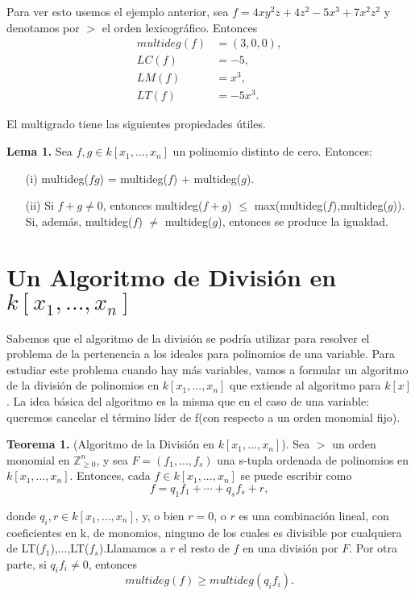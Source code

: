 Para ver esto usemos el ejemplo anterior, sea $f = 4xy^{2}z + 4z^{2} - 5x^{3} + 7x^{2}z^{2}$ y denotamos por $>$ el orden lexicográfico. Entonces
\begin{align*}
	multideg(f) &= (3,0,0), \\
	LC(f) &= -5,\\
	LM(f) &= x^{3},\\
	LT(f) &= -5x^{3}.
\end{align*} 

El multigrado tiene las siguientes propiedades útiles.

\textbf{Lema 1.} Sea $f,g \in k[x_{1},...,x_{n}]$ un polinomio distinto de cero. Entonces:
\begin{enumerate}
	\item [(i)]  multideg($fg$) = multideg($f$) + multideg($g$).
	\item [(ii)] Si $f + g \neq 0$, entonces multideg($f + g$) $\leq$ max(multideg($f$),multideg($g$)). Si, además, multideg($f$) $\neq$ multideg($g$), entonces se produce la igualdad.
\end{enumerate}

\section{Un Algoritmo de División en $k[x_{1},...,x_{n}]$}

Sabemos que el algoritmo de la división se podría utilizar para resolver el problema de la pertenencia a los ideales para polinomios de una variable. Para estudiar este problema cuando hay más variables, vamos a formular un algoritmo de la división de polinomios en $k[x_{1},...,x_{n}]$ que extiende al algoritmo para $k[x]$.
La idea básica del algoritmo es la misma que en el caso de una variable: queremos cancelar el término líder de f(con respecto a un orden monomial fijo).

\textbf{Teorema 1.} (Algoritmo de la División en $k[x_{1},...,x_{n}]$). Sea $>$ un orden monomial en $\mathbb{Z}^{n}_{\geq0}$, y sea $F = (f_{1},...,f_{s})$ una s-tupla ordenada de polinomios en $k[x_{1},...,x_{n}]$.
Entonces, cada $f \in k[x_{1},...,x_{n}]$ se puede escribir como
\[
f = q_{1}f_{1} + \cdots + q_{s}f_{s} + r,
\]

donde $q_{i},r \in k[x_{1},...,x_{n}]$, y, o bien $r = 0$, o $r$ es una combinación lineal, con coeficientes en k, de monomios, ninguno de los cuales es divisible por cualquiera de LT($f_{1}$),...,LT($f_{s}$).Llamamos a $r$ el resto de $f$ en una división por $F$. Por otra parte, si $q_{i}f_{i} \neq 0$, entonces
\[
multideg(f) \geq multideg(q_{i}f_{i}).
\]

